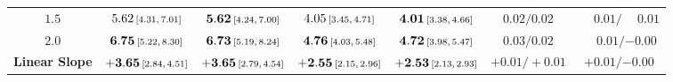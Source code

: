 \begin{table}[t]
{\begin{tabular}{c c c c c c c}
    $1.5$ & $5.62\ci{4.31}{7.01}$ & $\mathbf{5.62}\ci{4.24}{7.00}$ & $4.05\ci{3.45}{4.71}$ & $\mathbf{4.01}\ci{3.38}{4.66}$ & $0.02 / 0.02$ & $\phantom{-}0.01 / \phantom{-}0.01$ \\
    $2.0$ & $\mathbf{6.75}\ci{5.22}{8.30}$ & $\mathbf{6.73}\ci{5.19}{8.24}$ & $\mathbf{4.76}\ci{4.03}{5.48}$ & $\mathbf{4.72}\ci{3.98}{5.47}$ & $0.03 / 0.02$ & $\phantom{-}0.01 / {-0.00}$ \\
    \midrule
    \textbf{Linear Slope} & $\mathbf{+3.65}\ci{2.84}{4.51}$ & $\mathbf{+3.65}\ci{2.79}{4.54}$ & $\mathbf{+2.55}\ci{2.15}{2.96}$ & $\mathbf{+2.53}\ci{2.13}{2.93}$ & $+0.01 / +0.01$ & $+0.01 / {-0.00}$ \\
    \bottomrule
  \end{tabular}%
  }
\end{table}

